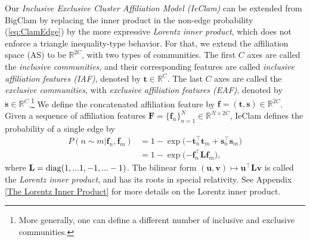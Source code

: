 \documentclass{article}
\theoremstyle{plain}
\theoremstyle{definition}
\theoremstyle{remark}
\begin{document}
Our \emph{Inclusive Exclusive Cluster Affiliation Model (IeClam)} can be extended from BigClam by replacing the inner product in the non-edge probability (\ref{eq:ClamEdge}) by the more expressive \emph{Lorentz inner product}, which does not enforce a triangle inequality-type behavior. 
For that, we extend the affiliation space (AS) to be $\mathbb{R}^{2C}$, with two types of communities. The first $C$ axes are called the \emph{inclusive communities}, and their corresponding features are called \emph{inclusive affiliation features (IAF)}, denoted by $\mathbf{t}\in\mathbb{R}^C$. The last $C$ axes are called the \emph{exclusive communities}, with \emph{exclusive affiliation features (EAF)}, denoted by $\mathbf{s} \in \mathbb{R}^C$.\footnote{More generally, one can define a different number of inclusive and exclusive communities.} We define the concatenated affiliation feature by $\mathbf{f} = (\mathbf{t},\mathbf{s})\in\mathbb{R}^{2C}$. Given a sequence of affiliation features  $\mathbf{F}=\{\mathbf{f}_n\}_{n=1}^N\in\mathbb{R}^{N\times 2C}$, IeClam defines the probability of a single edge by
\begin{equation}
\begin{split}
    P(n\sim m| \mathbf{f}_n,\mathbf{f}_m) & = 1-\exp\big({-\mathbf{t}_n^{\top } \mathbf{t}_m +  \mathbf{s}_n^{\top } \mathbf{s}_m}\big) \\  
   &  = 1-\exp\big({-\mathbf{f}_n^{\top } \mathbf{L} \mathbf{f}_m}\big),
    \label{eq:LorFeature}
    \end{split}
\end{equation}
where $\mathbf{L} = {\rm diag}(1,...1,-1,...-1)$. The bilinear form $(\mathbf{u},\mathbf{v})\mapsto \mathbf{u}^\top  \mathbf{L} \mathbf{v}$ is called the \emph{Lorentz inner product}, and has its roots in special relativity. See Appendix \ref{The Lorentz Inner Product} for more details on the Lorentz inner product. 
\end{document}
